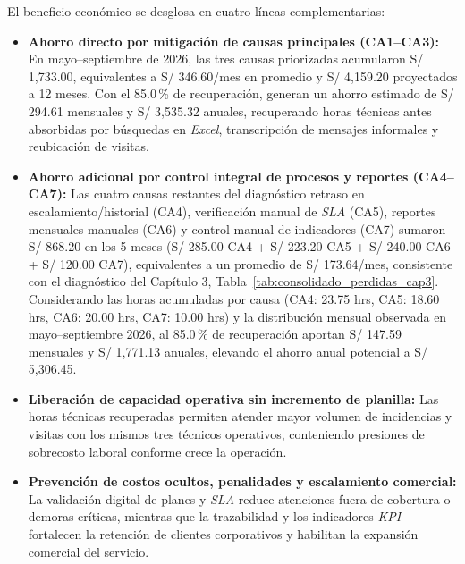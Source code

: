 El beneficio económico se desglosa en cuatro líneas complementarias:

\begin{itemize}[leftmargin=1.27cm]
    \item \textbf{Ahorro directo por mitigación de causas principales (CA1–CA3):} En mayo–septiembre de 2026, las tres causas priorizadas acumularon S/ 1,733.00, equivalentes a S/ 346.60/mes en promedio y S/ 4,159.20 proyectados a 12 meses. Con el 85.0\,\% de recuperación, generan un ahorro estimado de S/ 294.61 mensuales y S/ 3,535.32 anuales, recuperando horas técnicas antes absorbidas por búsquedas en \textit{Excel}, transcripción de mensajes informales y reubicación de visitas.
    \item \textbf{Ahorro adicional por control integral de procesos y reportes (CA4–CA7):} Las cuatro causas restantes del diagnóstico retraso en escalamiento/historial (CA4), verificación manual de \textit{SLA} (CA5), reportes mensuales manuales (CA6) y control manual de indicadores (CA7) sumaron S/ 868.20 en los 5 meses (S/ 285.00 CA4 + S/ 223.20 CA5 + S/ 240.00 CA6 + S/ 120.00 CA7), equivalentes a un promedio de S/ 173.64/mes, consistente con el diagnóstico del Capítulo 3, Tabla~\ref{tab:consolidado_perdidas_cap3}. Considerando las horas acumuladas por causa (CA4: 23.75 hrs, CA5: 18.60 hrs, CA6: 20.00 hrs, CA7: 10.00 hrs) y la distribución mensual observada en mayo–septiembre 2026, al 85.0\,\% de recuperación aportan S/ 147.59 mensuales y S/ 1,771.13 anuales, elevando el ahorro anual potencial a S/ 5,306.45.
    \item \textbf{Liberación de capacidad operativa sin incremento de planilla:} Las horas técnicas recuperadas permiten atender mayor volumen de incidencias y visitas con los mismos tres técnicos operativos, conteniendo presiones de sobrecosto laboral conforme crece la operación.
    \item \textbf{Prevención de costos ocultos, penalidades y escalamiento comercial:} La validación digital de planes y \textit{SLA} reduce atenciones fuera de cobertura o demoras críticas, mientras que la trazabilidad y los indicadores \textit{KPI} fortalecen la retención de clientes corporativos y habilitan la expansión comercial del servicio.
\end{itemize}


